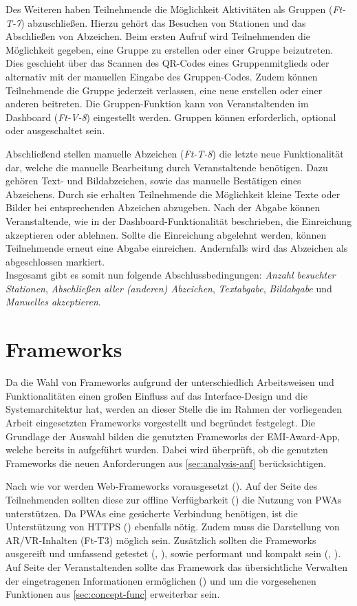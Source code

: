 Des Weiteren haben Teilnehmende die Möglichkeit Aktivitäten als Gruppen
(\textit{Ft-T-7}) abzuschließen. Hierzu gehört das Besuchen von Stationen und
das Abschließen von Abzeichen. Beim ersten Aufruf wird Teilnehmenden die
Möglichkeit gegeben, eine Gruppe zu erstellen oder einer Gruppe beizutreten.
Dies geschieht über das Scannen des QR-Codes eines Gruppenmitglieds oder
alternativ mit der manuellen Eingabe des Gruppen-Codes. Zudem können
Teilnehmende die Gruppe jederzeit verlassen, eine neue erstellen oder einer
anderen beitreten. Die Gruppen-Funktion kann von Veranstaltenden im Dashboard
(\textit{Ft-V-8}) eingestellt werden. Gruppen können erforderlich, optional oder
ausgeschaltet sein.

Abschließend stellen manuelle Abzeichen (\textit{Ft-T-8}) die letzte neue
Funktionalität dar, welche die manuelle Bearbeitung durch Veranstaltende
benötigen. Dazu gehören Text- und Bildabzeichen, sowie das manuelle Bestätigen
eines Abzeichens. Durch sie erhalten Teilnehmende die Möglichkeit kleine Texte
oder Bilder bei entsprechenden Abzeichen abzugeben. Nach der Abgabe können
Veranstaltende, wie in der Dashboard-Funktionalität beschrieben, die Einreichung
akzeptieren oder ablehnen. Sollte die Einreichung abgelehnt werden, können
Teilnehmende erneut eine Abgabe einreichen. Andernfalls wird das Abzeichen als
abgeschlossen markiert. \\
Insgesamt gibt es somit nun folgende Abschlussbedingungen: \textit{Anzahl
    besuchter Stationen}, \textit{Abschließen aller (anderen) Abzeichen},
\textit{Textabgabe}, \textit{Bildabgabe} und \textit{Manuelles akzeptieren}.

\section{Frameworks} \label{sec:frameworks}

Da die Wahl von Frameworks aufgrund der unterschiedlich Arbeitsweisen und
Funktionalitäten einen großen Einfluss auf das Interface-Design und die
Systemarchitektur hat, werden an dieser Stelle die im Rahmen der vorliegenden
Arbeit eingesetzten Frameworks vorgestellt und begründet festgelegt. Die
Grundlage der Auswahl bilden die genutzten Frameworks der EMI-Award-App, welche
bereits in  aufgeführt wurden. Dabei wird
überprüft, ob die genutzten Frameworks die neuen Anforderungen aus
\autoref{sec:analysis-anf} berücksichtigen.

Nach wie vor werden Web-Frameworks vorausgesetzt (). Auf der Seite
des Teilnehmenden sollten diese zur offline Verfügbarkeit () die
Nutzung von \acp{PWA} unterstützen. Da \acp{PWA} eine gesicherte Verbindung
benötigen, ist die Unterstützung von HTTPS () ebenfalls nötig. Zudem
muss die Darstellung von \ac{AR}/\ac{VR}-Inhalten (Ft-T3) möglich sein.
Zusätzlich sollten die Frameworks ausgereift und umfassend getestet
(, ), sowie performant und kompakt sein (,
). Auf Seite der Veranstaltenden sollte das Framework das
übersichtliche Verwalten der eingetragenen Informationen ermöglichen
() und um die vorgesehenen Funktionen aus \autoref{sec:concept-func}
erweiterbar sein.

